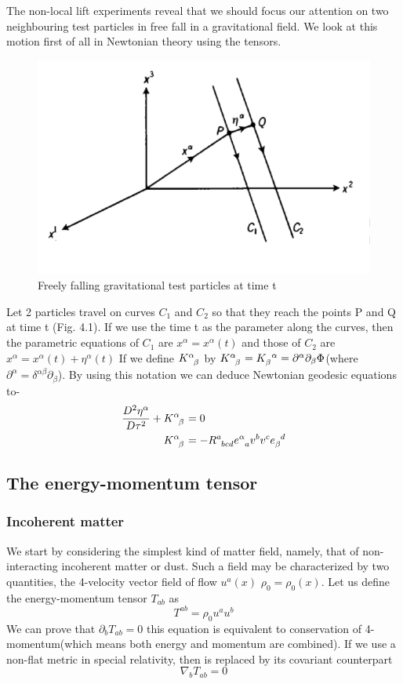 \documentclass[12pt,a4paper]{article}
\numberwithin{table}{section}
\numberwithin{figure}{section}
\numberwithin{equation}{section}
\theoremstyle{remark}
\theoremstyle{definition}
\begin{document}
The non-local lift experiments reveal that we should focus our attention on 
two neighbouring test particles in free fall in a gravitational field. We look at this motion first of all in Newtonian theory using the tensors.
\begin{figure}[H]
    \centering
  \includegraphics[scale=0.6]{deviation}
  \caption{Freely falling gravitational test particles at time t}
  \label{fig:deviation}
\end{figure}
Let 2 particles travel on curves $C_1$ and $C_2$ so that they reach the points P and Q at time t (Fig. 4.1). If we use the time t as the parameter along the 
curves, then the parametric equations of $C_1$ are $x^{\alpha}=x^{\alpha}(t)$
and those of $C_2$ are $x^{\alpha}=x^{\alpha}(t)+\eta^{\alpha}(t)$
If we define $\tensor{K}{^\alpha_\beta}$ by
$\tensor{K}{^\alpha_\beta}=\tensor{K}{_\beta^\alpha}=\partial^\alpha\partial_\beta \Phi $(where $\partial^\alpha=\delta^{\alpha\beta}\partial_\beta$). By using this notation we can deduce Newtonian geodesic equations to-
\begin{align}
    \dfrac{D^2\eta^\alpha}{D\tau^2}+\tensor{K}{^\alpha_\beta}&=0\\
    \tensor{K}{^\alpha_\beta}&=-\tensor{R}{^a_{bcd}}\tensor{e}{^\alpha_a}v^bv^c\tensor{e}{_\beta^d}
\end{align}
\subsection{The energy-momentum tensor}
\subsubsection*{Incoherent matter}
We start by considering the simplest kind of matter field, namely, that of non-
interacting incoherent matter or dust. Such a field may be characterized by 
two quantities, the 4-velocity vector field of flow $u^a(x) $ $\rho_0=\rho_0(x)$. Let us define the energy-momentum tensor $T_{ab}$ as
\begin{equation}
   T^{ab}=\rho_0u^au^b 
\end{equation}
We can prove that $\partial_b T_{ab}=0$ this equation is equivalent to conservation of 4-momentum(which means both energy and momentum are combined). If we use a non-flat metric in special 
relativity, then is replaced by its covariant counterpart
$$\nabla_b T_{ab}=0$$
\end{document}
